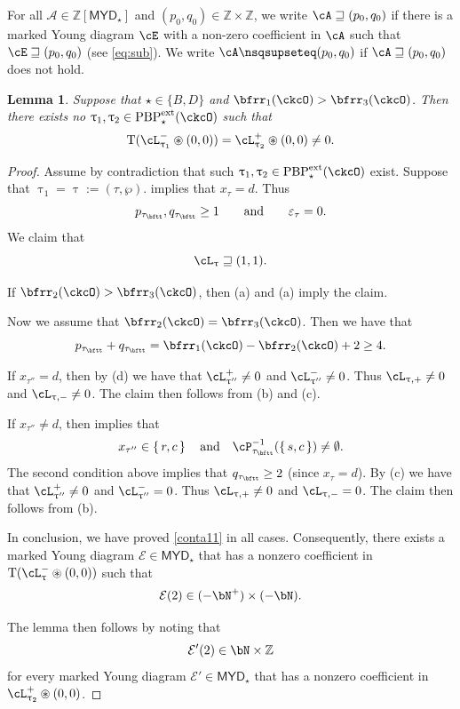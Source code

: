 \documentclass[11pt,a4paper]{amsart}
\def\MYD{{\mathsf{MYD}}}
\newcommand{\CA}{{\mathcal {A}}}
\newcommand{\CE}{{\mathcal {E}}}
\newcommand{\Z}{\mathbb{Z}}
\newcommand{\be}{\begin {equation}}
\newcommand{\ee}{\end {equation}}
\numberwithin{equation}{section}
\newtheorem{lem}[thm]{Lemma}
\theoremstyle{remark}
\def\PBPes{\mathrm{PBP}^{\mathrm{ext}}_{\star}}
\def\maltese{\mathrm{T}}
\def\MYD{{\mathsf{MYD}}}
\def\pac#1{\ac_{#1}^+}
\def\nac#1{\ac_{#1}^-}
\def\ac{\cL}
\begin{document}
For all $\CA\in \Z[\MYD_\star]$ and $(p_0,q_0)\in \Z\times \Z$, we write $\cA \sqsupseteq (p_{0},q_{0})$ if there is a marked Young diagram $\cE$ with
a non-zero coefficient in $\cA$ such that $\cE\sqsupseteq (p_{0},q_{0})$ (see \eqref{eq:sub}). We write $\cA \nsqsupseteq (p_{0},q_{0})$ if $\cA \sqsupseteq (p_{0},q_{0})$ does not hold. 
\begin{lem}\label{lempn0}
Suppose that $\star\in \{B,D\}$ and   $\bfrr_{1}(\ckcO)> \bfrr_{3}(\ckcO)$. Then there exists no $\uptau_1, \uptau_2\in \PBPes(\ckcO)$ such that 
    \begin{equation}\label{eq:pnac}
    \maltese (\nac{\uptau_1}\circledast (0,0)) =\pac{\uptau_2} \circledast (0,0) \neq 0.
     \end{equation}
\end{lem}
\begin{proof}
Assume by contradiction that such $\uptau_1, \uptau_2\in \PBPes(\ckcO)$ exist. Suppose that $\uptau_1=\uptau:=(\tau,\wp)$.  implies that $x_\tau=d$. Thus  
\[
  p_{\tau_\bftt}, q_{\tau_\bftt}\geq 1\qquad\textrm{and}\qquad \varepsilon_\tau=0.
\]
We claim that \be\label{conta11}
 \ac_{\uptau}\sqsupseteq (1,1).
 \ee
 
If $\bfrr_2(\ckcO)>\bfrr_3(\ckcO)$, then  (a) and 
 (a) imply the claim. 

Now we assume  that $\bfrr_2(\ckcO)=\bfrr_3(\ckcO)$. Then we have that 
\be\label{pplusq00}
p_{\tau_\bftt}+q_{\tau_\bftt}=\bfrr_1(\ckcO)-\bfrr_2(\ckcO)+2\geq 4. 
\ee 

If $x_{\tau''}=d$, then by  (d) we have that $\ac_{\uptau''}^+\neq 0$ and $\ac_{\uptau''}^-\neq 0$. Thus $\ac_{\uptau,+}\neq 0$ and $\ac_{\uptau,-}\neq 0$. The claim then follows from  (b) and (c). 

If $x_{\tau''}\neq d$, then  implies that
\be\label{taunotd}
x_{\tau''}\in \set{r,c}\quad\textrm{and}\quad 
    \cP_{\tau_\bftt}^{-1}(\set{s,c})\neq \emptyset.
    \ee
The second condition above implies that $q_{\tau_\bftt}\geq 2$ (since $x_\tau=d$).  By  (c) we have that $\ac_{\uptau''}^+\neq 0$ and $\ac_{\uptau''}^-= 0$. Thus $\ac_{\uptau,+}\neq 0$ and $\ac_{\uptau,-}= 0$. The claim then follows from  (b). 
 
 In conclusion, we have proved \eqref{conta11} in all cases. 
 Consequently, there exists a marked Young diagram $\CE\in \MYD_\star$ that has a nonzero coefficient in $\maltese (\nac{\uptau}\circledast (0,0))$ such that
 \[
   \CE(2)\in (-\bN^+)\times (-\bN). 
 \]

The lemma then follows by noting  that 
\[
   \CE'(2)\in \bN\times \Z
 \]
 for every marked Young diagram $\CE'\in \MYD_\star$ that has a nonzero coefficient in $\pac{\uptau_2} \circledast (0,0)$. 
 \end{proof}
\end{document}
